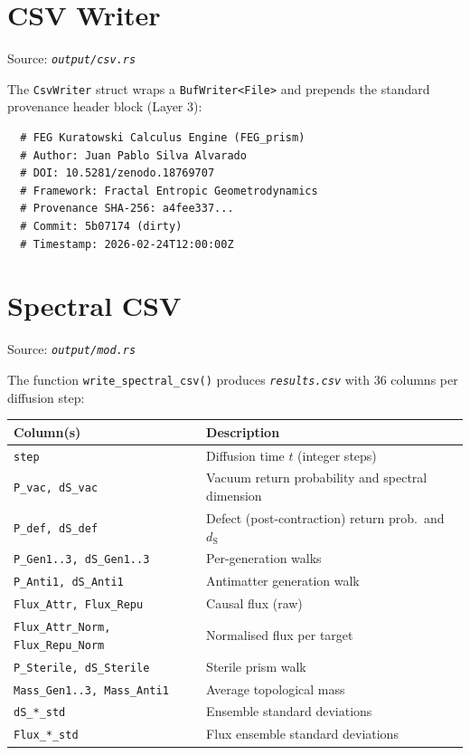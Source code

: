 \documentclass[11pt, a4paper, openany]{book}
\newcommand{\dS}{d_{\mathrm{S}}}
\newcommand{\code}[1]{\texttt{#1}}
\newcommand{\func}[1]{\texttt{\color{structure}#1}}
\newcommand{\file}[1]{\texttt{\itshape #1}}
\begin{document}
\section{CSV Writer}

Source: \file{output/csv.rs}

The \code{CsvWriter} struct wraps a \code{BufWriter<File>} and prepends the
standard provenance header block (Layer 3):

\begin{verbatim}
  # FEG Kuratowski Calculus Engine (FEG_prism)
  # Author: Juan Pablo Silva Alvarado
  # DOI: 10.5281/zenodo.18769707
  # Framework: Fractal Entropic Geometrodynamics
  # Provenance SHA-256: a4fee337...
  # Commit: 5b07174 (dirty)
  # Timestamp: 2026-02-24T12:00:00Z
\end{verbatim}

\section{Spectral CSV}

Source: \file{output/mod.rs}

The function \func{write\_spectral\_csv()} produces \file{results.csv} with
36 columns per diffusion step:

\begin{longtable}{lp{9cm}}
  \toprule
  \textbf{Column(s)} & \textbf{Description} \\
  \midrule
  \code{step}           & Diffusion time $t$ (integer steps) \\
  \code{P\_vac, dS\_vac}  & Vacuum return probability and spectral dimension \\
  \code{P\_def, dS\_def}  & Defect (post-contraction) return prob.\ and $\dS$ \\
  \code{P\_Gen1..3, dS\_Gen1..3} & Per-generation walks \\
  \code{P\_Anti1, dS\_Anti1}     & Antimatter generation walk \\
  \code{Flux\_Attr, Flux\_Repu}  & Causal flux (raw) \\
  \code{Flux\_Attr\_Norm, Flux\_Repu\_Norm} & Normalised flux per target \\
  \code{P\_Sterile, dS\_Sterile} & Sterile prism walk \\
  \code{Mass\_Gen1..3, Mass\_Anti1} & Average topological mass \\
  \code{dS\_*\_std}       & Ensemble standard deviations \\
  \code{Flux\_*\_std}     & Flux ensemble standard deviations \\
  \bottomrule
\end{longtable}
\end{document}

